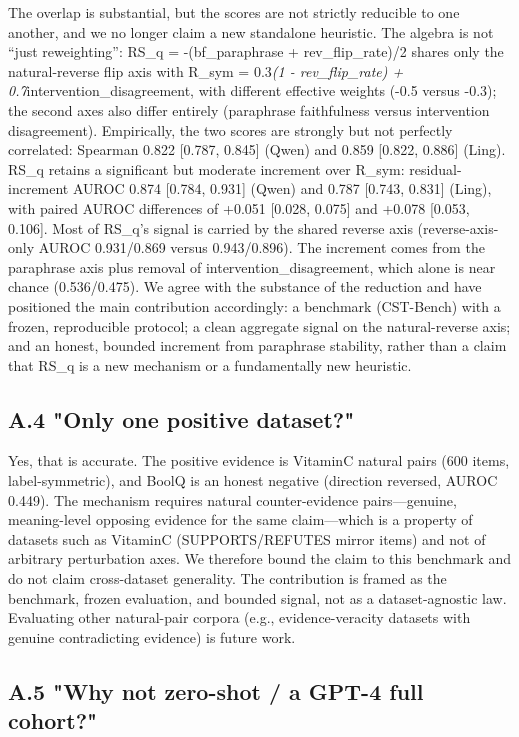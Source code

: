 \documentclass[11pt]{article}
\begin{document}
The overlap is substantial, but the scores are not strictly reducible to one another, and we no longer claim a new standalone heuristic. The algebra is not “just reweighting”: RS\_q = -(bf\_paraphrase + rev\_flip\_rate)/2 shares only the natural-reverse flip axis with R\_sym = 0.3\emph{(1 - rev\_flip\_rate) + 0.7}intervention\_disagreement, with different effective weights (-0.5 versus -0.3); the second axes also differ entirely (paraphrase faithfulness versus intervention disagreement). Empirically, the two scores are strongly but not perfectly correlated: Spearman 0.822 [0.787, 0.845] (Qwen) and 0.859 [0.822, 0.886] (Ling). RS\_q retains a significant but moderate increment over R\_sym: residual-increment AUROC 0.874 [0.784, 0.931] (Qwen) and 0.787 [0.743, 0.831] (Ling), with paired AUROC differences of +0.051 [0.028, 0.075] and +0.078 [0.053, 0.106]. Most of RS\_q's signal is carried by the shared reverse axis (reverse-axis-only AUROC 0.931/0.869 versus 0.943/0.896). The increment comes from the paraphrase axis plus removal of intervention\_disagreement, which alone is near chance (0.536/0.475). We agree with the substance of the reduction and have positioned the main contribution accordingly: a benchmark (CST-Bench) with a frozen, reproducible protocol; a clean aggregate signal on the natural-reverse axis; and an honest, bounded increment from paraphrase stability, rather than a claim that RS\_q is a new mechanism or a fundamentally new heuristic.

\subsection{A.4 "Only one positive dataset?"}

Yes, that is accurate. The positive evidence is VitaminC natural pairs (600 items, label-symmetric), and BoolQ is an honest negative (direction reversed, AUROC 0.449). The mechanism requires natural counter-evidence pairs—genuine, meaning-level opposing evidence for the same claim—which is a property of datasets such as VitaminC (SUPPORTS/REFUTES mirror items) and not of arbitrary perturbation axes. We therefore bound the claim to this benchmark and do not claim cross-dataset generality. The contribution is framed as the benchmark, frozen evaluation, and bounded signal, not as a dataset-agnostic law. Evaluating other natural-pair corpora (e.g., evidence-veracity datasets with genuine contradicting evidence) is future work.

\subsection{A.5 "Why not zero-shot / a GPT-4 full cohort?"}
\end{document}

